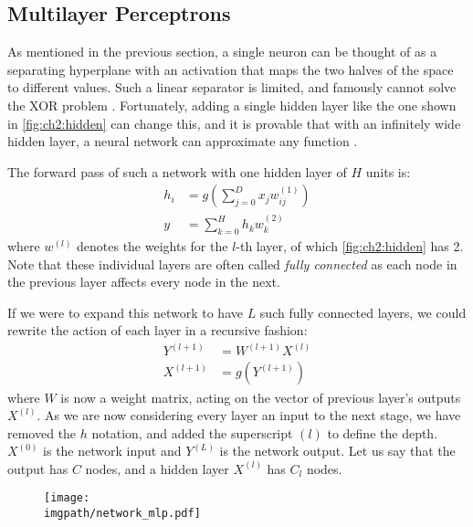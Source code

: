 \subsection{Multilayer Perceptrons}
As mentioned in the previous section, a single neuron can be thought of as a
separating hyperplane with an activation that maps the two halves of the space
to different values. Such a linear separator is limited, and famously cannot
solve the XOR problem \cite{minsky_perceptrons:_1988}. Fortunately, adding a
single hidden layer like the one shown in \autoref{fig:ch2:hidden} can change
this, and it is provable that with an infinitely wide hidden layer, a neural
network can approximate any function \cite{hornik_multilayer_1989,
cybenko_approximation_1989}. 

The forward pass of such a network with one hidden layer of $H$ units is:
%
\begin{align}
  h_i & =  g\left(\sum_{j=0}^{D} x_j w_{ij}^{(1)}\right) \\
  y & =  \sum_{k=0}^{H} h_k w^{(2)}_{k}
\end{align}
%
where $w^{(l)}$ denotes the weights for the $l$-th layer, of which
\autoref{fig:ch2:hidden} has 2. Note that these individual layers are often
called \emph{fully connected} as each node in the previous layer affects every
node in the next.

If we were to expand this network to have $L$ such fully connected layers, we
could rewrite the action of each layer in a recursive fashion:
%
\begin{align}
  Y^{(l+1)} &= W^{(l+1)}X^{(l)}  \label{eq:ch2:fc1}\\
  X^{(l+1)} &= g\left(Y^{(l+1)}\right) \label{eq:ch2:fc2} 
\end{align}
where $W$ is now a weight matrix, acting on the vector of previous layer's
outputs $X^{(l)}$. As we are now considering every layer an input to the next
stage, we have removed the $h$ notation, and added the superscript $(l)$ to
define the depth. $X^{(0)}$ is the network input and $Y^{(L)}$ is the network
output. Let us say that the output has $C$ nodes, and a hidden layer $X^{(l)}$
has $C_l$ nodes.

\begin{figure}[t]
  \centering
  \texttt{[image: \\imgpath/network\_mlp.pdf]}
  \label{fig:ch2:hidden}
\end{figure}

